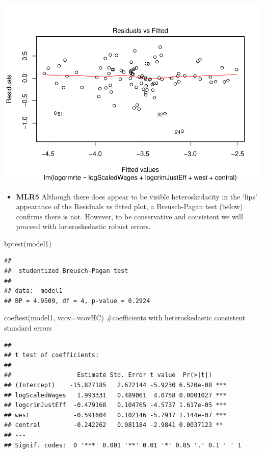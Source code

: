 \documentclass[]{article}
\newenvironment{Shaded}{}{}
\newcommand{\CommentTok}[1]{\textcolor[rgb]{0.00,0.50,0.00}{#1}}
\newcommand{\DataTypeTok}[1]{#1}
\newcommand{\KeywordTok}[1]{\textcolor[rgb]{0.00,0.00,1.00}{#1}}
\newcommand{\NormalTok}[1]{#1}
\providecommand{\tightlist}{%
  \setlength{\itemsep}{0pt}\setlength{\parskip}{0pt}}
\begin{document}
\includegraphics{Bagnard_Gaustad_Hartman_Leung_Lab_3_files/figure-latex/unnamed-chunk-61-1.pdf}

\begin{itemize}
\tightlist
\item
  \textbf{MLR5} Although there does appear to be visible heteroskedacity
  in the `lips' appearance of the Residuals vs fitted plot, a
  Breusch-Pagan test (below) confirms there is not. However, to be
  conservative and consistent we will proceed with heteroskedastic
  robust errors.
\end{itemize}

\begin{Shaded}
\begin{Highlighting}[]
\KeywordTok{bptest}\NormalTok{(model1)}
\end{Highlighting}
\end{Shaded}

\begin{verbatim}
## 
##  studentized Breusch-Pagan test
## 
## data:  model1
## BP = 4.9509, df = 4, p-value = 0.2924
\end{verbatim}

\begin{Shaded}
\begin{Highlighting}[]
\KeywordTok{coeftest}\NormalTok{(model1, }\DataTypeTok{vcov=}\NormalTok{vcovHC) }\CommentTok{#coefficients with heteroskedastic consistent standard errors}
\end{Highlighting}
\end{Shaded}

\begin{verbatim}
## 
## t test of coefficients:
## 
##                  Estimate Std. Error t value  Pr(>|t|)    
## (Intercept)    -15.827185   2.672144 -5.9230 6.520e-08 ***
## logScaledWages   1.993331   0.489061  4.0758 0.0001027 ***
## logcrimJustEff  -0.479168   0.104765 -4.5737 1.617e-05 ***
## west            -0.591604   0.102146 -5.7917 1.144e-07 ***
## central         -0.242262   0.081184 -2.9841 0.0037123 ** 
## ---
## Signif. codes:  0 '***' 0.001 '**' 0.01 '*' 0.05 '.' 0.1 ' ' 1
\end{verbatim}
\end{document}
